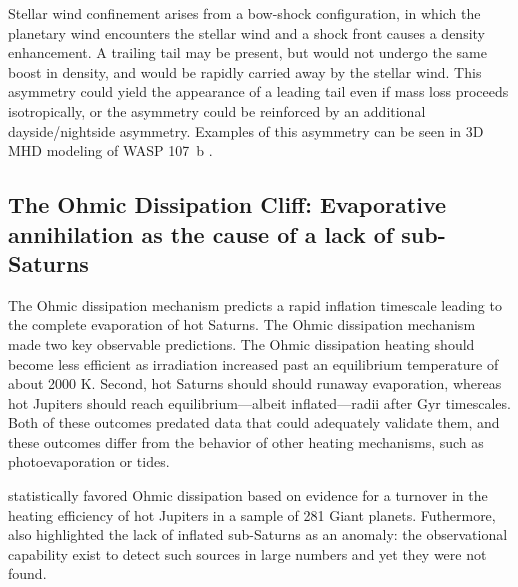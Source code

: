 \documentclass[twocolumn]{aastex631}
\begin{document}
Stellar wind confinement arises from a bow-shock configuration, in which the planetary wind encounters the stellar wind and a shock front causes a density enhancement.  A trailing tail may be present, but would not undergo the same boost in density, and would be rapidly carried away by the stellar wind.  This asymmetry could yield the appearance of a leading tail even if mass loss proceeds isotropically, or the asymmetry could be reinforced by an additional dayside/nightside asymmetry.  Examples of this asymmetry can be seen in 3D MHD modeling of WASP 107~b \citep{2022ApJ...926..226M}.



\subsection{The Ohmic Dissipation Cliff: Evaporative annihilation as the cause of a lack of sub-Saturns}
The Ohmic dissipation mechanism predicts a rapid inflation timescale leading to the complete evaporation of hot Saturns.  The Ohmic dissipation mechanism made two key observable predictions.  The Ohmic dissipation heating should become less efficient as irradiation increased past an equilibrium temperature of about 2000 K.  Second, hot Saturns should should runaway evaporation, whereas hot Jupiters should reach equilibrium---albeit inflated---radii after Gyr timescales.  Both of these outcomes predated data that could adequately validate them, and these outcomes differ from the behavior of other heating mechanisms, such as photoevaporation or tides.

\citet{2018AJ....155..214T} statistically favored Ohmic dissipation based on evidence for a turnover in the heating efficiency of hot Jupiters in a sample of 281 Giant planets.  Futhermore, \citet{2018AJ....155..214T} also highlighted the lack of inflated sub-Saturns as an anomaly: the observational capability exist to detect such sources in large numbers and yet they were not found.
\end{document}
